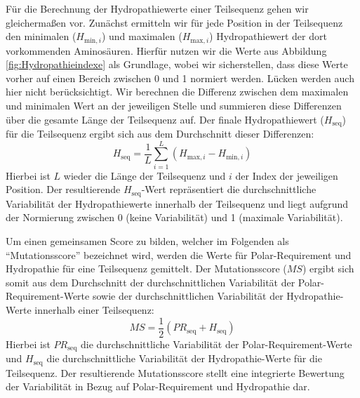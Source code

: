 \documentclass[german,version-2022-01]{uzl-thesis}
\begin{document}
F\"ur die Berechnung der Hydropathiewerte einer Teilsequenz gehen wir gleicherma\ss{}en vor. Zun\"achst ermitteln wir f\"ur jede Position in der Teilsequenz den minimalen ($H_{\text{min},i}$) und maximalen ($H_{\text{max},i}$) Hydropathiewert der dort vorkommenden Aminos\"auren. Hierf\"ur nutzen wir die Werte aus Abbildung \ref{fig:Hydropathieindexe} als Grundlage, wobei wir sicherstellen, dass diese Werte vorher auf einen Bereich zwischen 0 und 1 normiert werden. L\"ucken werden auch hier nicht ber\"ucksichtigt. Wir berechnen die Differenz zwischen dem maximalen und minimalen Wert an der jeweiligen Stelle und summieren diese Differenzen \"uber die gesamte L\"ange der Teilsequenz auf. Der finale Hydropathiewert ($H_{\text{seq}}$) f\"ur die Teilsequenz ergibt sich aus dem Durchschnitt dieser Differenzen:
\begin{equation}
    H_{\text{seq}} = \frac{1}{L} \sum_{i=1}^{L} (H_{\text{max},i} - H_{\text{min},i})
    \label{eq:hydropathie}
\end{equation} 
Hierbei ist $L$ wieder die L\"ange der Teilsequenz und $i$ der Index der jeweiligen Position. Der resultierende $H_{\text{seq}}$-Wert repr\"asentiert die durchschnittliche Variabilit\"at der Hydropathiewerte innerhalb der Teilsequenz und liegt aufgrund der Normierung zwischen 0 (keine Variabilit\"at) und 1 (maximale Variabilit\"at).

Um einen gemeinsamen Score zu bilden, welcher im Folgenden als "`Mutationsscore"' bezeichnet wird, werden die Werte f\"ur Polar-Requirement und Hydropathie f\"ur eine Teilsequenz gemittelt. Der Mutationsscore ($MS$) ergibt sich somit aus dem Durchschnitt der durchschnittlichen Variabilit\"at der Polar-Requirement-Werte sowie der durchschnittlichen Variabilit\"at der Hydropathie-Werte innerhalb einer Teilsequenz: 
\begin{equation}
    MS = \frac{1}{2} \left( PR_{\text{seq}} + H_{\text{seq}} \right)
    \label{eq:mutationsscore}
\end{equation}
Hierbei ist $PR_{\text{seq}}$ die durchschnittliche Variabilit\"at der Polar-Requirement-Werte und $H_{\text{seq}}$ die durchschnittliche Variabilit\"at der Hydropathie-Werte f\"ur die Teilsequenz. Der resultierende Mutationsscore stellt eine integrierte Bewertung der Variabilit\"at in Bezug auf Polar-Requirement und Hydropathie dar.
\end{document}
